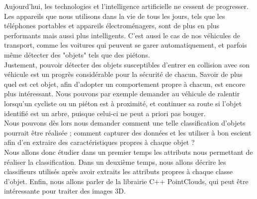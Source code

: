 Aujourd'hui, les technologies et l'intelligence artificielle ne cessent de progresser. Les appareils que nous utilisons dans la vie de tous les jours, tels que les téléphones portables et appareils électroménagers, sont de plus en plus performants mais aussi plus intelligents. C'est aussi le cas de nos véhicules de transport, comme les voitures qui peuvent se garer automatiquement, et parfois même détecter des "objets" tels que des piétons.\\

Justement, pouvoir détecter des objets susceptibles d'entrer en collision avec son véhicule est un progrès considérable pour la sécurité de chacun. Savoir de plus quel est cet objet, afin d'adopter un comportement propre à chacun, est encore plus intéressant. Nous pouvons par exemple demander au véhicule de ralentir lorsqu'un cycliste ou un piéton est à proximité, et continuer sa route si l'objet identifié est un arbre, puisque celui-ci ne peut a priori pas bouger.\\

Nous pouvons dès lors nous demander comment une telle classification d'objets pourrait être réalisée ; comment capturer des données et les utiliser à bon escient afin d'en extraire des caractéristiques propres à chaque objet ?\\

Nous allons donc étudier dans un premier temps les attributs nous permettant de réaliser la classification. Dans un deuxième temps, nous allons décrire les classifieurs utilisés après avoir extraits les attributs propres à chaque classe d'objet. Enfin, nous allons parler de la librairie C++ PointClouds, qui peut être intéressante pour traiter des images 3D.\\